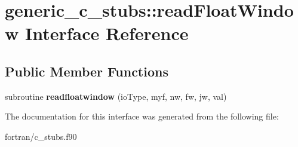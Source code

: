 \hypertarget{interfacegeneric__c__stubs_1_1read_float_window}{}\section{generic\+\_\+c\+\_\+stubs\+:\+:read\+Float\+Window Interface Reference}
\label{interfacegeneric__c__stubs_1_1read_float_window}
\subsection*{Public Member Functions}
\begin{DoxyCompactItemize}
\item 
\mbox{\label{interfacegeneric__c__stubs_1_1read_float_window_af27488441381d451e1c04364520fdb1b}} 
subroutine {\bfseries readfloatwindow} (io\+Type, myf, nw, fw, jw, val)
\end{DoxyCompactItemize}


The documentation for this interface was generated from the following file\+:\begin{DoxyCompactItemize}
\item 
fortran/c\+\_\+stubs.\+f90\end{DoxyCompactItemize}
